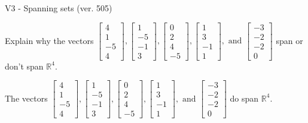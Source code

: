 \begin{exercise}
  \begin{exerciseTitle}V3 - Spanning sets (ver. 505)\end{exerciseTitle}
  \begin{exerciseStatement}
    Explain why the vectors \(\left[\begin{array}{r}
4 \\
1 \\
-5 \\
4
\end{array}\right] , \left[\begin{array}{r}
1 \\
-5 \\
-1 \\
3
\end{array}\right] , \left[\begin{array}{r}
0 \\
2 \\
4 \\
-5
\end{array}\right] , \left[\begin{array}{r}
1 \\
3 \\
-1 \\
1
\end{array}\right] , \text{ and } \left[\begin{array}{r}
-3 \\
-2 \\
-2 \\
0
\end{array}\right]\) span or don't span \(\mathbb{R}^4\). 
	


  \end{exerciseStatement}
  \begin{exerciseAnswer}
   The vectors \(\left[\begin{array}{r}
4 \\
1 \\
-5 \\
4
\end{array}\right] , \left[\begin{array}{r}
1 \\
-5 \\
-1 \\
3
\end{array}\right] , \left[\begin{array}{r}
0 \\
2 \\
4 \\
-5
\end{array}\right] , \left[\begin{array}{r}
1 \\
3 \\
-1 \\
1
\end{array}\right] , \text{ and } \left[\begin{array}{r}
-3 \\
-2 \\
-2 \\
0
\end{array}\right]\) 
  	 do  
	span \(\mathbb{R}^4\).
  



\end{exerciseAnswer}
\end{exercise}
